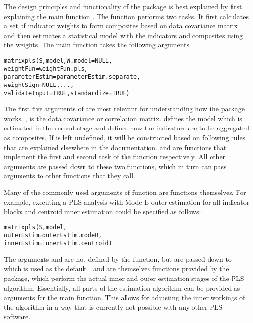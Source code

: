 \documentclass[a4paper]{book}
\begin{document}
\begin{Details}
The design principles and functionality of the package is best explained by first explaining the main
function . The function performs two tasks. It first calculates a set of indicator 
weights to form composites based on data covariance matrix and then estimates a statistical model
with the indicators and composites using the weights. The main function takes the following arguments:

\begin{alltt}
matrixpls(S, model, W.model = NULL, 
          weightFun = weightFun.pls, 
          parameterEstim = parameterEstim.separate,
          weightSign = NULL, ..., 
          validateInput = TRUE, standardize = TRUE)
\end{alltt}


The first five arguments of  are most relevant for understanding how the package
works. , is the data covariance or correlation matrix.  defines the model
which is estimated in the second stage and  defines how the indicators are to be
aggregated as composites. If  is left undefined, it will be constructed based on
 following rules that are explained elsewhere in the documentation.
 and 
 are functions that 
implement the first and second task of the function respectively. All other arguments are passed 
down to these two functions, which in turn can pass arguments to other functions that they call.


Many of the commonly used arguments of  function are functions themselves. For 
example, executing a PLS analysis with Mode B outer estimation for all indicator blocks and centroid inner 
estimation could be specified as follows:

\begin{alltt}
matrixpls(S, model, 
          outerEstim = outerEstim.modeB,
          innerEstim = innerEstim.centroid)
\end{alltt}


The arguments  and  are not defined by the
 function, but are passed down to  which is used as the default
.  and  are themselves functions provided
by the  package, which perform the actual inner and outer estimation stages of the
PLS algorithm. Essentially, all parts of the estimation algorithm can be provided as arguments for
the main function. This allows for adjusting the inner workings of the algorithm in a way that is
currently not possible with any other PLS software.


\end{Details}
\end{document}
